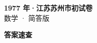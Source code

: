 \documentclass[zihao=-4, a4paper]{ctexart}
\begin{document}
\begin{center}
  {\Large\bfseries 1977 年·江苏苏州市初试卷}\\[4pt]
  {\large 数学 · 简答版}
\end{center}
\medskip
{}

\clearpage
{}
\begin{center}{\Large\bfseries 答案速查}\end{center}
\medskip

\end{document}
